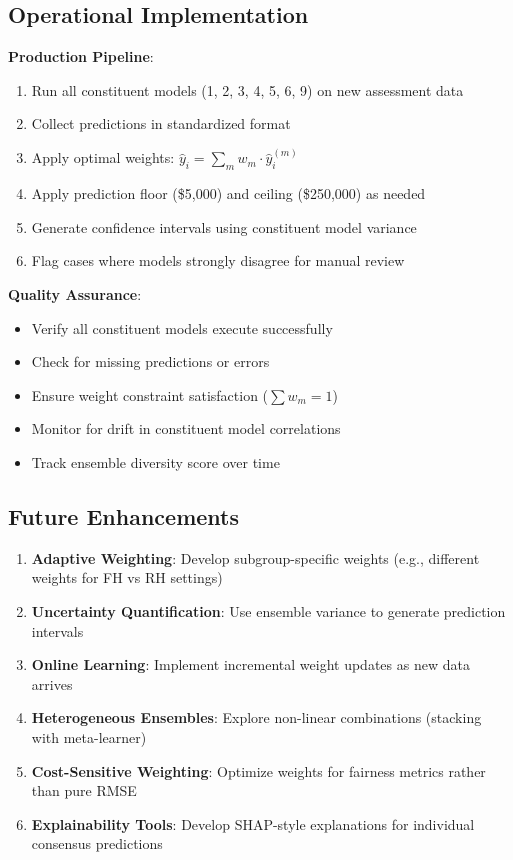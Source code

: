 \subsection{Operational Implementation}

\textbf{Production Pipeline}:
\begin{enumerate}
    \item Run all constituent models (1, 2, 3, 4, 5, 6, 9) on new assessment data
    \item Collect predictions in standardized format
    \item Apply optimal weights: $\hat{y}_i = \sum_m w_m \cdot \hat{y}_i^{(m)}$
    \item Apply prediction floor (\$5,000) and ceiling (\$250,000) as needed
    \item Generate confidence intervals using constituent model variance
    \item Flag cases where models strongly disagree for manual review
\end{enumerate}

\textbf{Quality Assurance}:
\begin{itemize}
    \item Verify all constituent models execute successfully
    \item Check for missing predictions or errors
    \item Ensure weight constraint satisfaction ($\sum w_m = 1$)
    \item Monitor for drift in constituent model correlations
    \item Track ensemble diversity score over time
\end{itemize}

\subsection{Future Enhancements}

\begin{enumerate}
    \item \textbf{Adaptive Weighting}: Develop subgroup-specific weights (e.g., different weights for FH vs RH settings)
    
    \item \textbf{Uncertainty Quantification}: Use ensemble variance to generate prediction intervals
    
    \item \textbf{Online Learning}: Implement incremental weight updates as new data arrives
    
    \item \textbf{Heterogeneous Ensembles}: Explore non-linear combinations (stacking with meta-learner)
    
    \item \textbf{Cost-Sensitive Weighting}: Optimize weights for fairness metrics rather than pure RMSE
    
    \item \textbf{Explainability Tools}: Develop SHAP-style explanations for individual consensus predictions
\end{enumerate}

